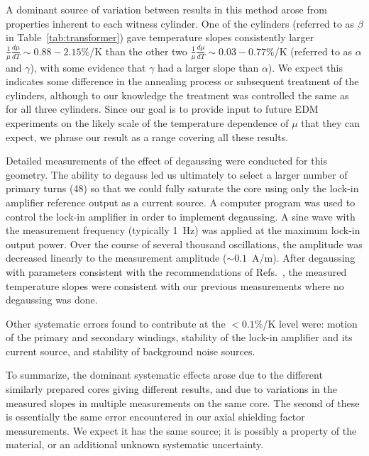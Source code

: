 A dominant source of variation between results in this method arose
from properties inherent to each witness cylinder.  One of the
cylinders (referred to as $\beta$ in Table~\ref{tab:transformer}) gave
temperature slopes consistently larger
$\frac{1}{\mu}\frac{d\mu}{dT}\sim 0.88-2.15$\%/K than the other two
$\frac{1}{\mu}\frac{d\mu}{dT}\sim 0.03-0.77$\%/K (referred to as
$\alpha$ and $\gamma$), with some evidence that $\gamma$ had a larger
slope than $\alpha$).  We expect this indicates some difference in the
annealing process or subsequent treatment of the cylinders, although
to our knowledge the treatment was controlled the same as for all
three cylinders.  Since our goal is to provide input to future EDM
experiments on the likely scale of the temperature dependence of $\mu$
that they can expect, we phrase our result as a range covering all
these results.

Detailed measurements of the effect of degaussing were conducted for
this geometry.  The ability to degauss led us ultimately to select a
larger number of primary turns (48) so that we could fully saturate
the core using only the lock-in amplifier reference output as a
current source.  A computer program was used to control the lock-in
amplifier in order to implement degaussing.  A sine wave with the
measurement frequency (typically 1~Hz) was applied at the maximum
lock-in output power.  Over the course of several thousand
oscillations, the amplitude was decreased linearly to the measurement
amplitude ($\sim 0.1$~A/m).  After degaussing with parameters
consistent with the recommendations of
Refs.~\cite{thiel2007demagnetization,altarev2015minimizing}, the measured temperature
slopes were consistent with our previous measurements where no
degaussing was done.

Other systematic errors found to contribute at the $<0.1\%$/K level
were: motion of the primary and secondary windings, stability of the
lock-in amplifier and its current source, and stability of background
noise sources.

To summarize, the dominant systematic effects arose due to the different
similarly prepared cores giving different results, and due to
variations in the measured slopes in multiple measurements on the same
core.  The second of these is essentially the same error encountered
in our axial shielding factor measurements.  We expect it has the same
source; it is possibly a property of the material, or an additional
unknown systematic uncertainty.
